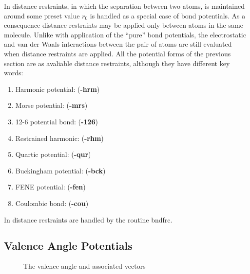 In \D{} distance restraints, in which the separation between two atoms,
is maintained around some preset value $r_0$ is handled as a special
case of bond potentials. As a consequence distance restraints may be
applied only between atoms in the same molecule.  Unlike with
application of the ``pure'' bond potentials, the electrostatic and van
der Waals interactions between the pair of atoms are still evaluated
when distance restraints are applied.  All the potential forms of the
previous section are as avaliable distance restraints, although they
have different key words:

\begin{enumerate}
\item Harmonic potential: ({\bf -hrm})
\item Morse potential:  ({\bf -mrs})
\item 12-6 potential bond: ({\bf -126})
\item Restrained harmonic: ({\bf -rhm})
\item Quartic potential:  ({\bf -qur})
\item Buckingham potential: ({\bf -bck})
\item FENE potential: ({\bf -fen})
\item Coulombic bond: ({\bf -cou})
\end{enumerate}

In \D{} distance restraints are handled by the routine {\sc bndfrc}.

\subsection{Valence Angle Potentials}

\begin{figure}[ht]
\begin{center}
\centerline{}
\caption{The valence angle and associated vectors}
\end{center}
\end{figure}

